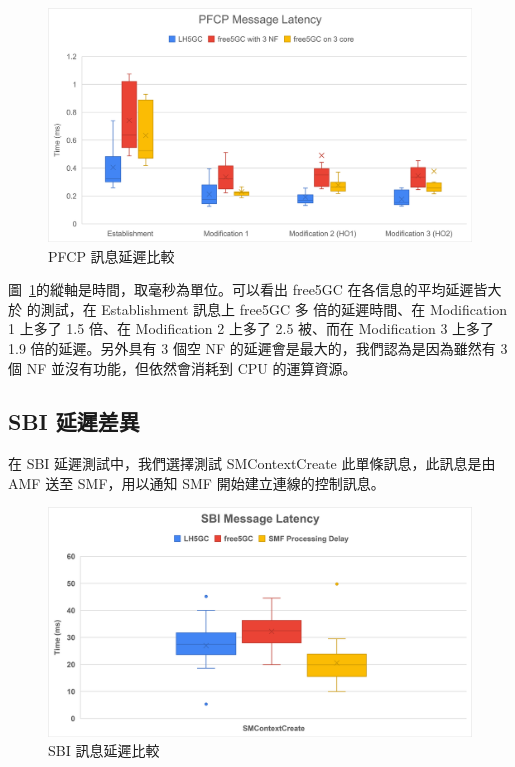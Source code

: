 \begin{figure}[htb]
    \centering
    \includegraphics[height=!,width=0.9\linewidth,keepaspectratio=true]{figures/cp_pfcp_comp}
    \caption[PFCP 訊息延遲比較]{{\footnotesize PFCP 訊息延遲比較}}
    \label{fig:cp_pfcp_comp}
\end{figure}

圖~\ref{fig:cp_pfcp_comp}的縱軸是時間，取毫秒為單位。可以看出 free5GC 在各信息的平均延遲皆大於 \LHCN 的測試，在 Establishment 訊息上 free5GC 多  倍的延遲時間、在 Modification 1 上多了 1.5 倍、在 Modification 2 上多了 2.5 被、而在 Modification 3 上多了 1.9 倍的延遲。另外具有 3 個空 NF 的延遲會是最大的，我們認為是因為雖然有 3 個 NF 並沒有功能，但依然會消耗到 CPU 的運算資源。

\subsection{SBI 延遲差異}
\label{subsec:sbi_comp}

在 SBI 延遲測試中，我們選擇測試 SMContextCreate 此單條訊息，此訊息是由 AMF 送至 SMF，用以通知 SMF 開始建立連線的控制訊息。

\begin{figure}[htbp]
    \centering
    \includegraphics[height=!,width=0.8\linewidth,keepaspectratio=true]{figures/cp_sbi_comp}
    \caption[SBI 訊息延遲比較]{{\footnotesize SBI 訊息延遲比較}}
    \label{fig:cp_sbi_comp}
\end{figure}

